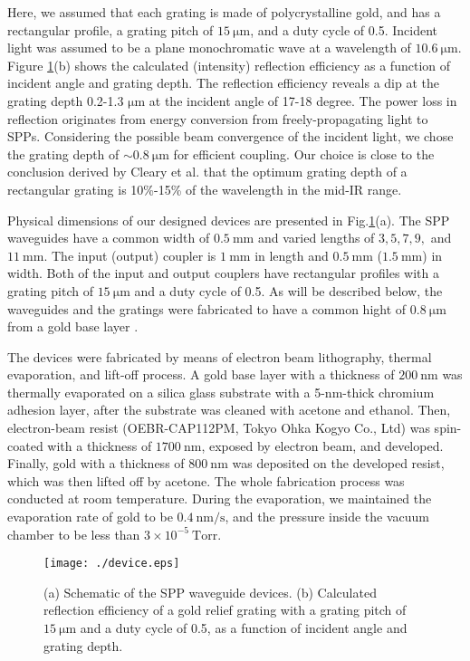 \documentclass[aip,apl,reprint]{revtex4-1}
\begin{document}
Here, we assumed that each grating is made of polycrystalline gold, and has a rectangular profile, a grating pitch of $15\:\mathrm{\mu m}$, and a duty cycle of 0.5. Incident light was assumed to be a plane monochromatic wave at a wavelength of $10.6\:\mathrm{\mu m}$. 
Figure \ref{fig:device}(b) shows the calculated (intensity) reflection efficiency as a function of incident angle and grating depth. The reflection efficiency reveals a dip at the grating depth 0.2-1.3 $\mathrm{\mu m}$ at the incident angle of 17-18 degree.
The power loss in reflection originates from energy conversion from freely-propagating light to SPPs.
Considering the possible beam convergence of the incident light, we chose the grating depth of $\sim0.8\:\mathrm{\mu m}$ for efficient coupling. Our choice is close to the conclusion derived by Cleary et al.\cite{Cleary2010} that the optimum grating depth of a rectangular grating is 10\%-15\% of the wavelength in the mid-IR range.

Physical dimensions of our designed devices are presented in Fig.\ref{fig:device}(a).  The SPP waveguides have a common width of $0.5\:\mathrm{mm}$ and varied lengths of $3, 5, 7, 9,$ and $11\:\mathrm{mm}$. The input (output) coupler is $1\:\mathrm{mm}$ in length and $0.5\:\mathrm{mm}$ ($1.5\:\mathrm{mm}$) in width. Both of the input and output couplers have rectangular profiles with a grating pitch of $15\:\mathrm{\mu m}$ and a duty cycle of 0.5. As will be described below, the waveguides and the gratings were fabricated to have a common hight of $0.8\:\mathrm{\mu m}$ from a gold base layer .

The devices were fabricated by means of electron beam lithography, thermal evaporation, and lift-off process. A gold base layer with a thickness of $200\:\mathrm{nm}$ was thermally evaporated on a silica glass substrate with a 5-nm-thick chromium adhesion layer, after the substrate was cleaned with acetone and ethanol. Then, electron-beam resist (OEBR-CAP112PM, Tokyo Ohka Kogyo Co., Ltd) was spin-coated with a thickness of $1700\:\mathrm{nm}$, exposed by electron beam, and developed. Finally, gold with a thickness of $800\:\mathrm{nm}$ was deposited on the developed resist, which was then lifted off by acetone. The whole fabrication process was conducted at room temperature. During the evaporation, we maintained the evaporation rate of gold to be $0.4\:\mathrm{nm/s}$, and the pressure inside the vacuum chamber to be less than $3\times10^{-5}\:\mathrm{Torr}$. 

 \begin{figure}[htbp]
   \begin{center}
    \texttt{[image: ./device.eps]}
    \caption{(a) Schematic of the SPP waveguide devices. (b) Calculated reflection efficiency of a gold relief grating with a grating pitch of $15\:\mathrm{\mu m}$ and a duty cycle of 0.5, as a function of incident angle and grating depth.}
     \label{fig:device}
   \end{center}
\end{figure}
\end{document}
